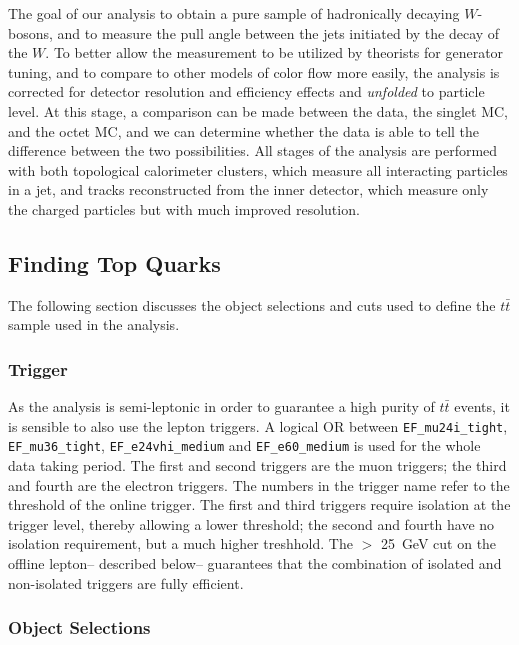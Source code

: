 The goal of our analysis to obtain a pure sample of hadronically decaying $W$-bosons, and to measure the pull angle between the jets initiated by the decay of the $W$. To better allow the measurement to be utilized by theorists for generator tuning, and to compare to other models of color flow more easily, the analysis is corrected for detector resolution and efficiency effects and \textit{unfolded} to particle level. At this stage, a comparison can be made between the data, the singlet MC, and the octet MC, and we can determine whether the data is able to tell the difference between the two possibilities. All stages of the analysis are performed with both topological calorimeter clusters, which measure all interacting particles in a jet, and tracks reconstructed from the inner detector, which measure only the charged particles but with much improved resolution.

\subsection{Finding Top Quarks}

The following section discusses the object selections and cuts used to define the $t\bar{t}$ sample used in the analysis.

\subsubsection{Trigger}

As the analysis is semi-leptonic in order to guarantee a high purity of $t\bar{t}$ events, it is sensible to also use the lepton triggers. A logical OR between {\tt EF\_mu24i\_tight}, {\tt EF\_mu36\_tight}, {\tt EF\_e24vhi\_medium} and {\tt EF\_e60\_medium} is used for the whole data taking period. The first and second triggers are the muon triggers; the third and fourth are the electron triggers. The numbers in the trigger name refer to the \pt threshold of the online trigger. The first and third triggers require isolation at the trigger level, thereby allowing a lower \pt threshold; the second and fourth have no isolation requirement, but a much higher \pt treshhold. The \pt $>$ 25~GeV cut on the offline lepton-- described below-- guarantees that the combination of isolated and non-isolated triggers are fully efficient.

\subsubsection{Object Selections}

